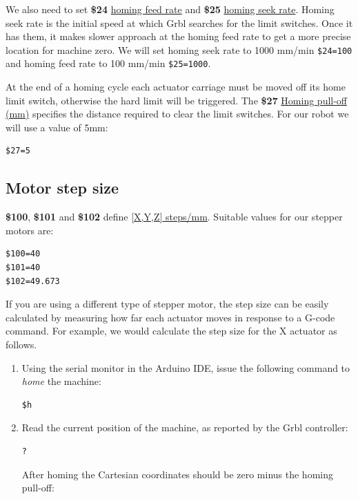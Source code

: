 \documentclass[]{book}
\theoremstyle{definition}
\theoremstyle{definition}
\theoremstyle{definition}
\theoremstyle{remark}
\begin{document}
We also need to set \textbf{\$24}
\href{https://github.com/gnea/grbl/wiki/Grbl-v1.1-Configuration\#24---homing-feed-mmmin}{homing
feed rate} and \textbf{\$25}
\href{https://github.com/gnea/grbl/wiki/Grbl-v1.1-Configuration\#25---homing-seek-mmmin}{homing
seek rate}. Homing seek rate is the initial speed at which Grbl searches
for the limit switches. Once it has them, it makes slower approach at
the homing feed rate to get a more precise location for machine zero. We
will set homing seek rate to 1000 mm/min \texttt{\$24=100} and homing
feed rate to 100 mm/min \texttt{\$25=1000}.

At the end of a homing cycle each actuator carriage must be moved off
its home limit switch, otherwise the hard limit will be triggered. The
\textbf{\$27}
\href{https://github.com/gnea/grbl/wiki/Grbl-v1.1-Configuration\#27---homing-pull-off-mm}{Homing
pull-off (mm)} specifies the distance required to clear the limit
switches. For our robot we will use a value of 5mm:

\begin{verbatim}
$27=5
\end{verbatim}

\subsection{Motor step size}\label{motor-step-size}

\textbf{\$100}, \textbf{\$101} and \textbf{\$102} define
\href{https://github.com/gnea/grbl/wiki/Grbl-v1.1-Configuration\#100-101-and-102--xyz-stepsmm}{{[}X,Y,Z{]}
steps/mm}. Suitable values for our stepper motors are:

\begin{verbatim}
$100=40
$101=40
$102=49.673
\end{verbatim}

If you are using a different type of stepper motor, the step size can be
easily calculated by measuring how far each actuator moves in response
to a G-code command. For example, we would calculate the step size for
the X actuator as follows.

\begin{enumerate}
\def\labelenumi{\arabic{enumi}.}
\item
  Using the serial monitor in the Arduino IDE, issue the following
  command to \emph{home} the machine:

\begin{verbatim}
$h
\end{verbatim}
\item
  Read the current position of the machine, as reported by the Grbl
  controller:

\begin{verbatim}
?
\end{verbatim}

  After homing the Cartesian coordinates should be zero minus the homing
  pull-off:
\end{enumerate}
\end{document}
